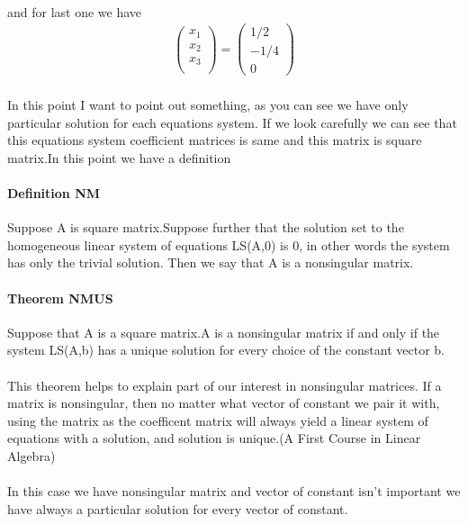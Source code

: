 \documentclass[11pt]{article}
\begin{document}
\paragraph{}and for last one we have
\begin{eqnarray*}
\begin{pmatrix}
x_1\\
x_2\\
x_3\\
\end{pmatrix}
=
\begin{pmatrix}
1/2\\
-1/4\\
0
\end{pmatrix}
\end{eqnarray*}

\paragraph{}In this point I want to point out something, as you can see we have only particular solution for each equations system. If we look carefully we can see that this equations system coefficient matrices is same and this matrix is square matrix.In this point we have a definition
\paragraph{Definition NM}Suppose A is square matrix.Suppose further that the solution set to the homogeneous linear system of equations LS(A,0) is {0}, in other words the system has only the trivial solution. Then we say that A is a nonsingular matrix.
\paragraph{Theorem NMUS} Suppose that A is a square matrix.A is a nonsingular matrix if and only if the system LS(A,b) has a unique solution for every choice of the constant vector b.
\paragraph{}This theorem helps to explain part of our interest in nonsingular matrices. If a matrix is nonsingular, then no matter what vector of constant we pair it with, using the matrix as the coefficent matrix will always yield a linear system of equations with a solution, and solution is unique.(A First Course in Linear Algebra)
\paragraph{}In this case we have nonsingular matrix and vector of constant isn't important we have always a particular solution for every vector of constant.
\end{document}
